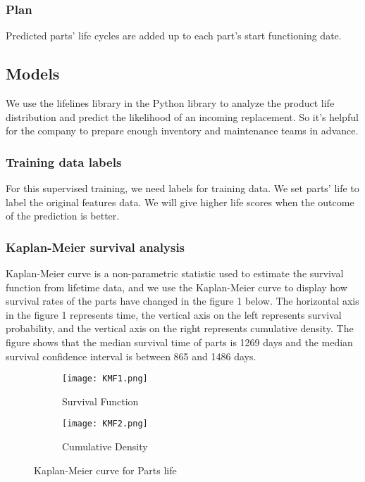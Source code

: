\documentclass[11pt]{article}
\begin{document}
\subsubsection{Plan}
Predicted parts' life cycles are added up to each part's start functioning date. 

\subsection{Models}
We use the lifelines library in the Python library to analyze the product life distribution and predict the likelihood of an incoming replacement. So it's helpful for the company to prepare enough inventory and maintenance teams in advance.

\subsubsection{Training data labels}
For this supervised training, we need labels for training data. We set parts' life to label the original features data. We will give higher life scores when the outcome of the prediction is better.  

\subsubsection{Kaplan-Meier survival analysis}

Kaplan-Meier curve is a non-parametric statistic used to estimate the survival function from lifetime data, and we use the Kaplan-Meier curve to display how survival rates of the parts have changed in the figure 1 below. The horizontal axis in the figure 1 represents time, the vertical axis on the left represents survival probability, and the vertical axis on the right represents cumulative density. The figure shows that the median survival time of parts is 1269 days and the median survival confidence interval is between 865 and 1486 days.

\begin{figure}[h]
\begin{subfigure}{0.5\textwidth}
\texttt{[image: KMF1.png]} 
\caption{Survival Function}
\label{fig:subim1}
\end{subfigure}
\begin{subfigure}{0.5\textwidth}
\texttt{[image: KMF2.png]}
\caption{Cumulative Density}
\label{fig:subim2}
\end{subfigure}
\caption{Kaplan-Meier curve for Parts life}
\label{fig:image2}
\end{figure}
\end{document}
